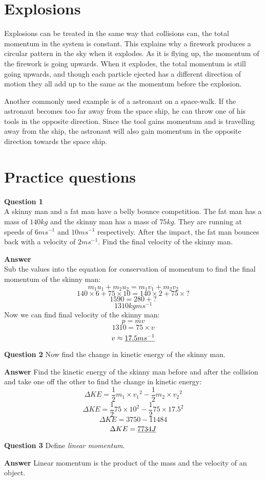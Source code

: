 \documentclass{article}
\begin{document}
\section*{Explosions}
\label{sec:Explosions}
Explosions can be treated in the same way that collisions can, the total
momentum in the system is constant. This explains why a firework produces a
circular pattern in the sky when it explodes. As it is flying up, the momentum
of the firework is going upwards. When it explodes, the total momentum is still
going upwards, and though each particle ejected has a different direction of
motion they all add up to the same as the momentum before the explosion.

Another commonly used example is of a astronaut on a space-walk. If the
astronaut becomes too far away from the space ship, he can throw one of his
tools in the opposite direction. Since the tool gains momentum and is travelling
away from the ship, the astronaut will also gain momentum in the opposite
direction towards the space ship.


\section*{Practice questions}
\label{sec:PracticeQuestions}
\textbf{Question 1}\\
A skinny man and a fat man have a belly bounce competition. The fat man has a 
mass of $140kg$ and the skinny man has a mass of $75kg$. They are running at 
speeds of $6ms^{-1}$ and $10ms^{-1}$ respectively. After the impact, the fat man
bounces back with a velocity of $2ms^{-1}$. Find the final velocity of the
skinny man.

\textbf{Answer} \\
Sub the values into the equation for conservation of momentum to find the final
momentum of the skinny man:
\[
	m_1 u_1 + m_2 u_2 = m_1 v_1 + m_2 v_2
\]
\[
	140 \times 6 + 75 \times 10 = 140 \times 2 + 75 \times ?
\]
\[
	1590 = 280 + ?
\]
\[
	1310 kgms^{-1}
\]
Now we can find final velocity of the skinny man:
\[
	p = mv
\]
\[
	1310 = 75 \times v
\]
\[
	v \approx \uline{17.5ms^{-1}}
\]

\textbf{Question 2}
Now find the change in kinetic energy of the skinny man.

\textbf{Answer}
Find the kinetic energy of the skinny man before and after the collision and
take one off the other to find the change in kinetic energy:
\[
	\Delta KE = \frac{1}{2}m_1 \times {v_1}^2 - \frac{1}{2}m_2 \times {v_2}^2
\]
\[
	\Delta KE = \frac{1}{2}75 \times 10^2 - \frac{1}{2}75 \times 17.5^2
\]
\[
	\Delta KE = 3750 - 11484
\]
\[
	\Delta KE = \uline{7734J}
\]

\textbf{Question 3}
Define \textit{linear momentum}.

\textbf{Answer}
Linear momentum is the product of the mass and the velocity of an object.
\end{document}
